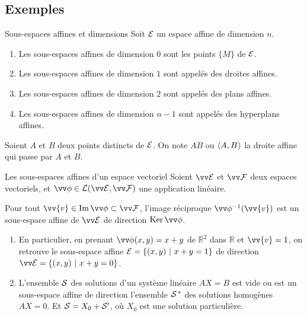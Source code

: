 \documentclass[bigger]{m53beamer}
\begin{document}
\subsection{Exemples}
  \begin{frame}{Sous-espaces affines et dimensions}
    Soit $\mathcal{E}$ un espace affine de dimension $n$.
    \begin{enumerate}[<+(1)->]
      \item Les sous-espaces affines de dimension $0$ sont les points $\{M\}$ de $\mathcal{E}$.
      \item Les sous-espaces affines de dimension $1$ sont appelés \alert{des droites affines}.
      \item Les sous-espaces affines de dimension $2$ sont appelés \alert{des plans affines}.
      \item Les sous-espaces affines de dimension $n-1$ sont appelés \alert{des hyperplans affines}.
    \end{enumerate}\pause

    Soient $A$ et $B$ deux points distincts de $\mathcal{E}$. On note $AB$ ou $\langle{A,B}\kern.07em\rangle$ la droite affine qui passe par $A$ et $B$.
  \end{frame}
  \begin{frame}{Les sous-espaces affines d'un espace vectoriel}
    Soient $\ev{E}$ et $\ev{F}$ deux espaces vectoriels, et $\vv\phi \in \mathcal{L}(\ev{E},\ev{F})$ une application linéaire.\pause\\
    \begin{proposition}
      Pour tout $\vv{v}\in\im\vv\phi\subset\ev{F}$, l'image réciproque $\vv\phi^{-1}(\vv{v})$ est un sous-espace affine de $\ev{E}$ de direction $\ker{\vv\phi}$.
    \end{proposition}
    \begin{enumerate}[<+(1)->]
      \item En particulier, en prenant $\vv\phi(x,y)=x+y$ de $\mathbb{R}^{2}$ dans $\mathbb{R}$ et $\vv{v}=1$, on retrouve le sous-espace affine $\mathcal{E}=\{(x,y)\ |\ x+y=1 \}$ de direction $\ev{E}=\{(x,y)\ |\ x+y=0 \}$.
      \item L'ensemble $\mathcal{S}$ des solutions d'un système linéaire $AX=B$ est vide ou est un sous-espace affine de direction l'ensemble $\mathcal{S^{\,\ast}}$ des solutions homogènes $AX=0$. Et $\mathcal{S}=X_{0}+\mathcal{S}'$, où $X_{0}$ est une solution particulière.
    \end{enumerate}
  \end{frame}
\end{document}
